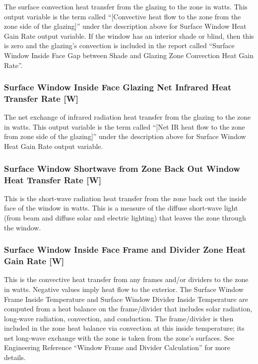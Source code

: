 The surface convection heat transfer from the glazing to the zone in watts. This output variable is the term called ``{[}Convective heat flow to the zone from the zone side of the glazing{]}'' under the description above for Surface Window Heat Gain Rate output variable. If the window has an interior shade or blind, then this is zero and the glazing's convection is included in the report called ``Surface Window Inside Face Gap between Shade and Glazing Zone Convection Heat Gain Rate''.

\subsubsection{Surface Window Inside Face Glazing Net Infrared Heat Transfer Rate {[}W{]}}\label{surface-window-inside-face-glazing-net-infrared-heat-transfer-rate-w}

The net exchange of infrared radiation heat transfer from the glazing to the zone in watts. This output variable is the term called ``{[}Net IR heat flow to the zone from zone side of the glazing{]}'' under the description above for Surface Window Heat Gain Rate output variable.

\subsubsection{Surface Window Shortwave from Zone Back Out Window Heat Transfer Rate {[}W{]}}\label{surface-window-shortwave-from-zone-back-out-window-heat-transfer-rate-w}

This is the short-wave radiation heat transfer from the zone back out the inside face of the window in watts. This is a measure of the diffuse short-wave light (from beam and diffuse solar and electric lighting) that leaves the zone through the window.

\subsubsection{Surface Window Inside Face Frame and Divider Zone Heat Gain Rate {[}W{]}}\label{surface-window-inside-face-frame-and-divider-zone-heat-gain-rate-w}

This is the convective heat transfer from any frames and/or dividers to the zone in watts. Negative values imply heat flow to the exterior. The Surface Window Frame Inside Temperature and Surface Window Divider Inside Temperature are computed from a heat balance on the frame/divider that includes solar radiation, long-wave radiation, convection, and conduction. The frame/divider is then included in the zone heat balance via convection at this inside temperature; its net long-wave exchange with the zone is taken from the zone's surfaces. See Engineering Reference ``Window Frame and Divider Calculation'' for more details.

